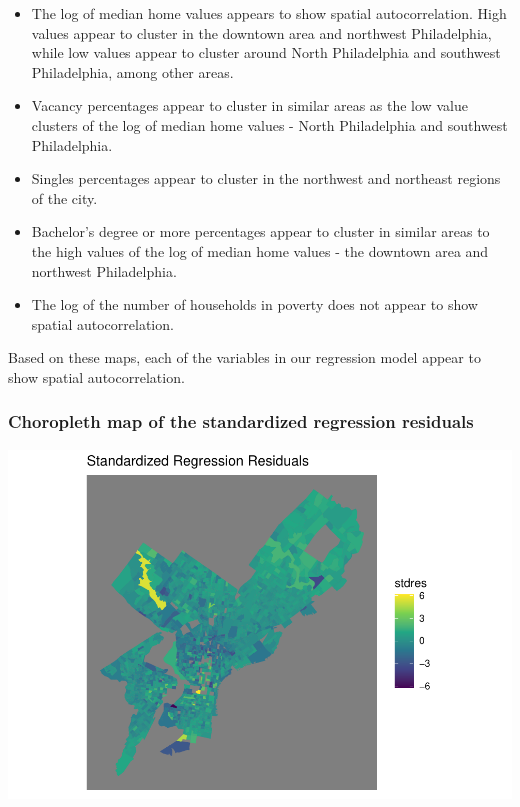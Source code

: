 \documentclass[
]{article}
\providecommand{\tightlist}{%
  \setlength{\itemsep}{0pt}\setlength{\parskip}{0pt}}
\begin{document}
\begin{itemize}
\tightlist
\item
  The log of median home values appears to show spatial autocorrelation.
  High values appear to cluster in the downtown area and northwest
  Philadelphia, while low values appear to cluster around North
  Philadelphia and southwest Philadelphia, among other areas.
\item
  Vacancy percentages appear to cluster in similar areas as the low
  value clusters of the log of median home values - North Philadelphia
  and southwest Philadelphia.
\item
  Singles percentages appear to cluster in the northwest and northeast
  regions of the city.
\item
  Bachelor's degree or more percentages appear to cluster in similar
  areas to the high values of the log of median home values - the
  downtown area and northwest Philadelphia.
\item
  The log of the number of households in poverty does not appear to show
  spatial autocorrelation.
\end{itemize}

Based on these maps, each of the variables in our regression model
appear to show spatial autocorrelation.

\hypertarget{choropleth-map-of-the-standardized-regression-residuals}{%
\subsubsection{Choropleth map of the standardized regression
residuals}\label{choropleth-map-of-the-standardized-regression-residuals}}

\includegraphics{HW1-Regression_files/figure-latex/resid map-1.pdf}
\end{document}
